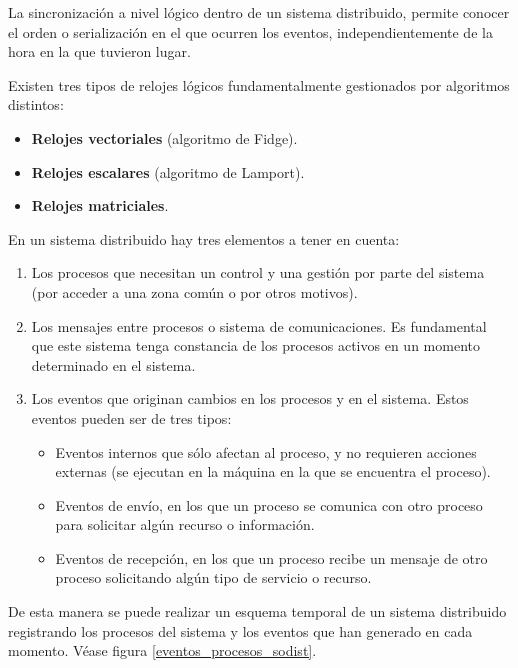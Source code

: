 \documentclass[a4paper, 11pt, titlepage]{article}
\begin{document}
        La sincronización a nivel lógico dentro de un sistema distribuido, permite conocer el orden o 
        serialización en el que ocurren los eventos, independientemente de la hora en la que tuvieron 
        lugar.

        Existen tres tipos de relojes lógicos fundamentalmente gestionados por algoritmos distintos:

        \begin{itemize}
            \item \textbf{Relojes vectoriales} (algoritmo de Fidge).
            \item \textbf{Relojes escalares} (algoritmo de Lamport).
            \item \textbf{Relojes matriciales}.
        \end{itemize}

        En un sistema distribuido hay tres elementos a tener en cuenta:

        \begin{enumerate}
            \item Los procesos que necesitan un control y una gestión por parte del sistema (por acceder 
            a una zona común o por otros motivos).
            \item Los mensajes entre procesos o sistema de comunicaciones. Es fundamental que este sistema 
            tenga constancia de los procesos activos en un momento determinado en el sistema.
            \item Los eventos que originan cambios en los procesos y en el sistema. Estos eventos pueden 
            ser de tres tipos: 
            \begin{itemize}
                \item Eventos internos que sólo afectan al proceso, y no requieren acciones externas (se 
                ejecutan en la máquina en la que se encuentra el proceso).
                \item Eventos de envío, en los que un proceso se comunica con otro proceso para solicitar 
                algún recurso o información.
                \item Eventos de recepción, en los que un proceso recibe un mensaje de otro proceso solicitando 
                algún tipo de servicio o recurso.
            \end{itemize}
        \end{enumerate}

        De esta manera se puede realizar un esquema temporal de un sistema distribuido registrando los 
        procesos del sistema y los eventos que han generado en cada momento. Véase figura \ref{eventos_procesos_sodist}.
\end{document}
